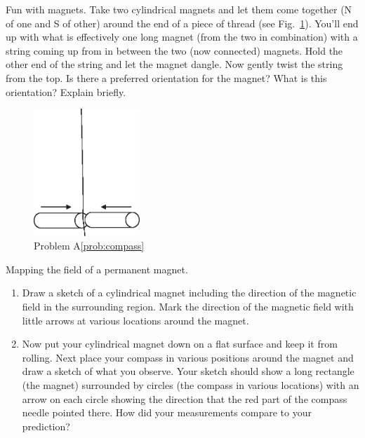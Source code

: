 \begin{aproblem}{Fun with magnets.}
  Take two cylindrical magnets and let them come together (N of one
  and S of other) around the end of a piece of thread (see
  Fig.~\ref{fig:compass}). You'll end up with what is effectively one
  long magnet (from the two in combination) with a string coming up
  from in between the two (now connected) magnets.  Hold the other end
  of the string and let the magnet dangle.  Now gently twist the
  string from the top. Is there a preferred orientation for the
  magnet? What is this orientation? Explain briefly.
  \label{prob:compass}

  \begin{figure}[h]
    \begin{center}
      \includegraphics[width=4cm]{additional_problems/compass}
      \caption{Problem A\ref{prob:compass}} \label{fig:compass}
    \end{center}
  \end{figure}
\end{aproblem}


\begin{aproblem}{Mapping the field of a permanent magnet.}
  \begin{enumerate}
  \item Draw a sketch of a cylindrical magnet including the direction
    of the magnetic field in the surrounding region. Mark the
    direction of the magnetic field with little arrows at various
    locations around the magnet.
  \item Now put your cylindrical magnet down on a flat surface and
    keep it from rolling.  Next place your compass in various
    positions around the magnet and draw a sketch of what you observe.
    Your sketch should show a long rectangle (the magnet) surrounded
    by circles (the compass in various locations) with an arrow on
    each circle showing the direction that the red part of the compass
    needle pointed there.  How did your measurements compare to your
    prediction?
  \end{enumerate}
\end{aproblem}

